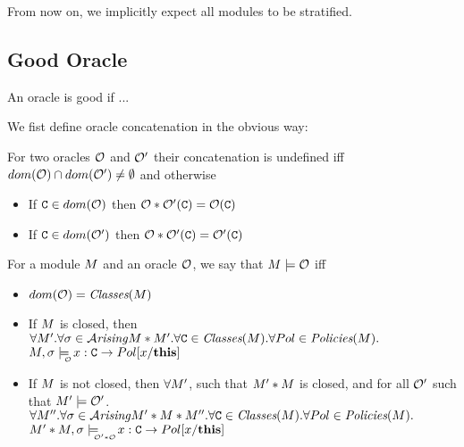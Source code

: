 {\begin{lemma}
 \end{lemma}

 From now on, we implicitly expect all modules to be stratified.



\subsection{Good Oracle}
 An oracle is good if ...

 We fist define oracle concatenation in the obvious way:
 \begin{definition}
 \label{def:good:oracle}
 For two oracles  ${\cal O}$ and ${\cal O}'$  their concatenation is undefined iff
  $dom({\cal O})\cap dom({\cal O}') \neq \emptyset$
 and otherwise
 \begin{itemize}
      \item
      If ${\textrm{\ttfamily{C}}}\in dom({\cal O})$ then ${\cal O}*{\cal O}'({\textrm{\ttfamily{C}}})={\cal O}({\textrm{\ttfamily{C}}})$
     \item
    If ${\textrm{\ttfamily{C}}}\in dom({\cal O}')$ then ${\cal O}*{\cal O}'({\textrm{\ttfamily{C}}})={\cal O}'({\textrm{\ttfamily{C}}})$
 \end{itemize}
 \end{definition}

 \begin{definition}
 \label{def:good:oracle}
 For a module $M$ and an oracle ${\cal O}$, we say that $M \models {\ensuremath{\cal O}}$ iff
 \begin{itemize}
     \item
      $dom({\cal O})={\textrm{{\it {Classes}}}}({M})$
     \item
   If $M$ is closed, then \ \
   $\forall M'.\forall \sigma\in{\mathcal{A}}\textrm{\textit{rising}}{\ensuremath {M}*\ensuremath {M}'}. \forall {\ensuremath{\textrm{\ttfamily{C}}}}\in {\textrm{{\it {Classes}}}}({M}). \forall Pol\in{\textrm{{\it {Policies}}}}({M}).$\\
     $\M,\sigma \modelsWithO x:\CP \rightarrow Pol[x/\this]$
    \item
    If $M$ is not closed, then $\forall M'$, such that $M'*M$ is closed, and for all
    ${\cal O}'$ such that $M'\models{\ensuremath{\cal O}}'$.
    $\forall M''.\forall \sigma\in{\mathcal{A}}\textrm{\textit{rising}}{\ensuremath {M}'*\ensuremath {M}*\ensuremath {M}''}. \forall {\ensuremath{\textrm{\ttfamily{C}}}}\in {\textrm{{\it {Classes}}}}({M}). \forall Pol\in{\textrm{{\it {Policies}}}}({M}).$\\
     $\M'*\M,\sigma \modelsWith{\O'*\O} x:\CP \rightarrow Pol[x/\this]$
 \end{itemize}
 \end{definition}

}
